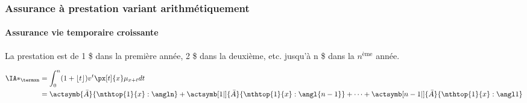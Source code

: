 \documentclass[10pt, french]{article}
\begin{document}
\begin{multicols*}{3}


\columnbreak
\subsubsection*{\textcolor{amber(sae/ece)}{Assurance à prestation variant arithmétiquement}}
\paragraph{Assurance vie temporaire croissante}
\begin{definitionNOHFILLprop}
La prestation est de 1 \$ dans la première année, 2 \$ dans la deuxième, etc. jusqu'à n \$ dans la $n^{\text{ème}}$ année.

\begin{align*}
	\IA*_{\termxn} 
	&=	\int_{0}^{n} (1 + \lfloor t \rfloor) v^{t} \px[t]{x} \mu_{x + t} dt \\
	&=	\actsymb{\bar{A}}{\nthtop{1}{x}:\angln} + \actsymb[1|]{\bar{A}}{\nthtop{1}{x}:\angl{n - 1}} + \dots + \actsymb[n - 1|]{\bar{A}}{\nthtop{1}{x}:\angl1}
\end{align*}

\begin{center}
\begin{tikzpicture}[x=0.75pt,y=0.75pt,yscale=-1,xscale=1]


\end{tikzpicture}
\end{center}
\end{definitionNOHFILLprop}
\end{multicols*}
\end{document}
